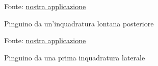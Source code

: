 \documentclass[crop=false, class=book]{standalone}
\begin{document}
	\begin{figure}
			\centering
			{Fonte: \url{nostra applicazione}}
			\caption{Pinguino da un'inquadratura lontana posteriore}
			\label{fig: pinguino lontano2}
	\end{figure}
	
	\begin{figure}
			\centering
			{Fonte: \url{nostra applicazione}}
			\caption{Pinguino da una prima inquadratura laterale}
			\label{fig: pinguino angolo1}
	\end{figure}
	
\end{document}
